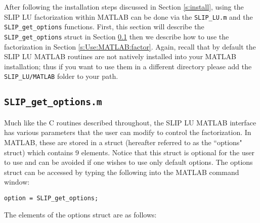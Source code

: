 \documentclass[12pt]{article}
\theoremstyle{definition}
\begin{document}
After following the installation steps discussed in Section \ref{s:install},
using the SLIP LU factorization within MATLAB can be done via the
\verb|SLIP_LU.m| and the \verb|SLIP_get_options| functions. First, this section
will describe the \verb|SLIP_get_options| struct in Section
\ref{s:Use:MATLAB:setup} then we describe how to use the factorization in
Section \ref{s:Use:MATLAB:factor}. Again, recall that by default the SLIP LU
MATLAB routines are not natively installed into your MATLAB installation; thus
if you want to use them in a different directory please add the
\verb|SLIP_LU/MATLAB| folder to your path.

\cprotect\subsection{\verb|SLIP_get_options.m|}
\label{s:Use:MATLAB:setup}

Much like the C routines described throughout, the SLIP LU MATLAB interface has
various parameters that the user can modify to control the factorization. In
MATLAB, these are stored in a struct (hereafter referred to as the ``options"
struct) which contains 9 elements. Notice that this struct is optional for the
user to use and can be avoided if one wishes to use only default options. The
options struct can be accessed by typing the following into the MATLAB command
window:

\verb|option = SLIP_get_options;|

The elements of the options struct are as follows:
\end{document}
